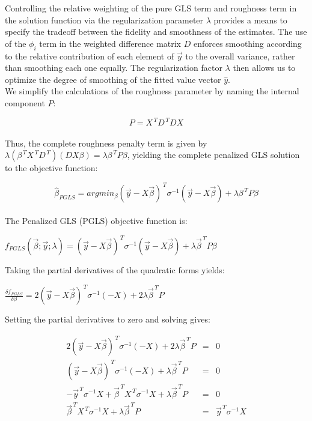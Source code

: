 \documentclass[12pt]{article}
\begin{document}
Controlling the relative weighting of the pure GLS term and roughness term in the solution function via the regularization parameter $\lambda$ provides a means to specify the tradeoff between the fidelity and smoothness of the estimates. The use of the $\phi_i$ term in the weighted difference matrix $D$ enforces smoothing according to the relative contribution of each element of $\vec{y}$ to the overall variance, rather than smoothing each one equally. The regularization factor $\lambda$ then allows us to optimize the degree of smoothing of the fitted value vector $\hat{y}$.\\

We simplify the calculations of the roughness parameter by naming the internal component $P$:

\begin{equation}
P=X^{\, T}D^{\, T}DX\label{eq20}
\end{equation}\\

Thus, the complete roughness penalty term is given by $\lambda(\beta^{\, T}X^{\, T}D^{\, T})(DX\beta)=\lambda\beta^{\, T}P\beta$, yielding the complete penalized GLS solution to the objective function:

\begin{equation}
\hat{\beta}_{PGLS} = argmin_{\beta}(\vec{y}-X \vec{\beta})^{\, T}\sigma^{-1}(\vec{y}-X\vec{\beta})+\lambda\beta^{\, T}P\beta\label{eq21}
\end{equation}\\

The Penalized GLS (PGLS) objective function is:

\begin{center}
$f_{PGLS}(\vec{\beta} ; \vec{y} ; \lambda) = (\vec{y}-X\vec{\beta})^{\, T}\sigma^{-1}(\vec{y}-X\vec{\beta})+\lambda\vec{\beta}^{\, T}P\beta$
\end{center}

Taking the partial derivatives of the quadratic forms yields:

\begin{center}
$\frac{\delta f_{PGLS}}{\delta\beta}=2(\vec{y}-X\vec{\beta})^{\, T}\sigma^{-1}(-X)+2\lambda\vec{\beta}^{\, T}P$
\end{center}

Setting the partial derivatives to zero and solving gives:

\begin{eqnarray*}
2(\vec{y}-X\vec{\beta})^{\, T}\sigma^{-1}(-X)+2\lambda\vec{\beta}^{\, T}P&=&0\\[10px]
(\vec{y}-X\vec{\beta})^{\, T}\sigma^{-1}(-X)+\lambda\vec{\beta}^{\, T}P&=&0\\[10px]
-\vec{y}^{\, T}\sigma^{-1}X+\vec{\beta}^{\, T}X^{\, T}\sigma^{-1}X+\lambda\vec{\beta}^{\, T}P&=&0\\[10px]
\vec{\beta}^{\, T}X^{\, T}\sigma^{-1}X+\lambda\vec{\beta}^{\, T}P&=&\vec{y}^{\, T}\sigma^{-1}X
\end{eqnarray*}
\end{document}
